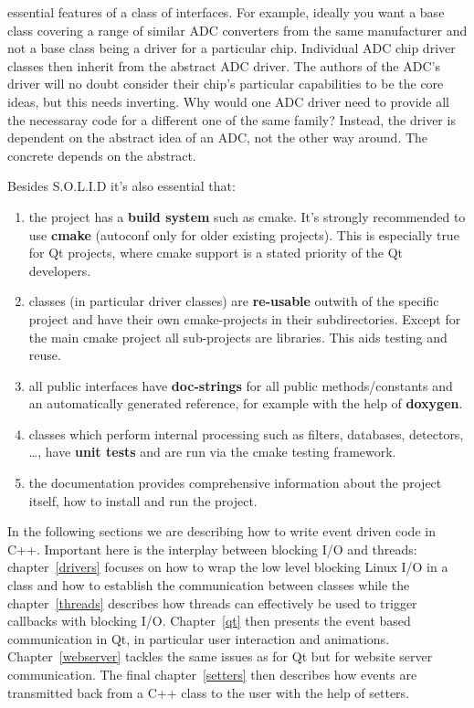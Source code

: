 \documentclass[12pt]{report}
\begin{document}
\begin{description}
  essential features of a class of interfaces. For example, ideally
  you want a base class covering a range of similar
  ADC converters from the same manufacturer and not a base class being
  a driver for a particular chip. Individual ADC chip driver
  classes then inherit from the abstract ADC driver. The authors of
  the ADC's driver will no doubt consider their chip's
  particular capabilities to be the core ideas,
  but this needs inverting. Why would one ADC driver need
  to provide all the necessaray code for a different one of the
  same family? Instead, the driver is dependent on the abstract
  idea of an ADC, not the other way around. The concrete depends
  on the abstract.
\end{description}


Besides S.O.L.I.D it's also essential that:
\begin{enumerate}
\item the project has a \textbf{build system} such as cmake. It's
  strongly recommended to use \textbf{cmake} (autoconf only for older existing
  projects). This is especially true for Qt projects, where cmake support
  is a stated priority of the Qt developers.
\item classes (in particular driver classes) are \textbf{re-usable}
  outwith of the specific project and have
  their own cmake-projects in their subdirectories. Except for the main
  cmake project all sub-projects are libraries. This aids testing and
  reuse.
\item all public interfaces have \textbf{doc-strings} for all public
  methods/constants and an automatically generated reference, for
  example with the help of \textbf{doxygen}.
\item classes which perform internal processing such as filters,
  databases, detectors, \ldots, have \textbf{unit tests} and are run via
  the cmake testing framework.
\item the documentation provides comprehensive information about the project itself,
  how to install and run the project.
\end{enumerate}

In the following sections we are describing how to write event driven
code in C++. Important here is the interplay between blocking I/O and
threads: chapter~\ref{drivers} focuses on how to wrap the low
level blocking Linux I/O in a class and how to establish the
communication between classes while the chapter~\ref{threads}
describes how threads can effectively be used to trigger callbacks
with blocking I/O. Chapter~\ref{qt} then presents the event based
communication in Qt, in particular user interaction and animations.
Chapter~\ref{webserver} tackles the same issues as for Qt but for
website server communication. The final chapter~\ref{setters} then
describes how events are transmitted back from a C++ class to the user
with the help of setters.
\end{document}
